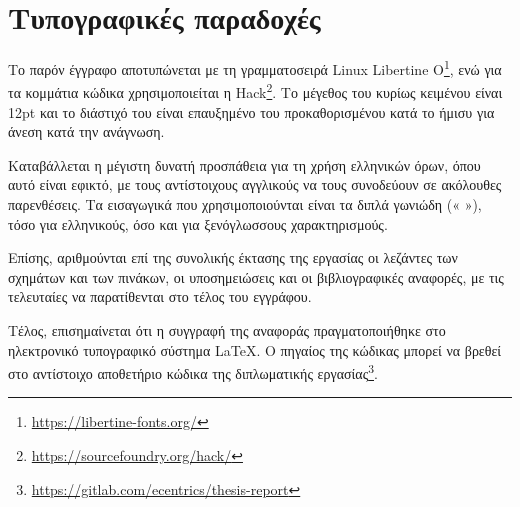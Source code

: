 \section{Τυπογραφικές παραδοχές} \label{section:1-6-typography}

Το παρόν έγγραφο αποτυπώνεται με τη γραμματοσειρά Linux Libertine O\footnote{\url{https://libertine-fonts.org/}}, ενώ για τα κομμάτια κώδικα χρησιμοποιείται η Hack\footnote{\url{https://sourcefoundry.org/hack/}}. Το μέγεθος του κυρίως κειμένου είναι 12pt και το διάστιχό του είναι επαυξημένο του προκαθορισμένου κατά το ήμισυ για άνεση κατά την ανάγνωση.

Καταβάλλεται η μέγιστη δυνατή προσπάθεια για τη χρήση ελληνικών όρων, όπου αυτό είναι εφικτό, με τους αντίστοιχους αγγλικούς να τους συνοδεύουν σε ακόλουθες παρενθέσεις. Τα εισαγωγικά που χρησιμοποιούνται είναι τα διπλά γωνιώδη (« »), τόσο για ελληνικούς, όσο και για ξενόγλωσσους χαρακτηρισμούς.

Επίσης, αριθμούνται επί της συνολικής έκτασης της εργασίας οι λεζάντες των σχημάτων και των πινάκων, οι υποσημειώσεις και οι βιβλιογραφικές αναφορές, με τις τελευταίες να παρατίθενται στο τέλος του εγγράφου.

Τέλος, επισημαίνεται ότι η συγγραφή της αναφοράς πραγματοποιήθηκε στο ηλεκτρονικό τυπογραφικό σύστημα \LaTeX. Ο πηγαίος της κώδικας μπορεί να βρεθεί στο αντίστοιχο αποθετήριο κώδικα της διπλωματικής εργασίας\footnote{\url{https://gitlab.com/ecentrics/thesis-report}}.
